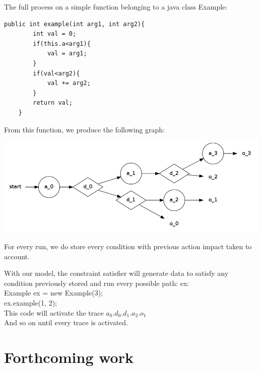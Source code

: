 \documentclass[a4paper]{report}
\begin{document}
The full process on a simple function belonging to a java class Example:\\


\begin{lstlisting}
public int example(int arg1, int arg2){
		int val = 0;
		if(this.a<arg1){
			val = arg1;
		}
		if(val<arg2){
			val += arg2;
		}
		return val;
	}
\end{lstlisting}
From this function, we produce the following graph:\\

\begin{center}
   \includegraphics[scale=0.3]{../graphviz/doubleStackGraph.png}
\end{center}

For every run, we do store every condition with previous action impact taken to account.

With our model, the constraint satisfier will generate data to satisfy any condition previously stored and run every possible path:
ex:\\
Example ex = new Example(3);\\
ex.example(1, 2);\\
This code will activate the trace $a_0.d_0.d_1.a_2.o_1$\\

And so on until every trace is activated.



\chapter*{Forthcoming work}
\end{document}
